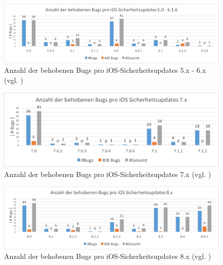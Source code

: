 \begin{figure}[htbp!]
        \centering
                \includegraphics[scale=0.5]{Bilder/iOSSicherheitsupdate5.png}
        \caption{Anzahl der behobenen Bugs pro iOS-Sicherheitsupdates 5.x - 6.x \newline (vgl. \cite{Apple[7]}) \protect\footnotemark}
        \label{fig:AnalyseiOSSicherheitsupdate5}
\end{figure}

\newpage
\begin{figure}[htbp!]
        \centering
                \includegraphics[scale=0.7]{Bilder/iOSSicherheitsupdate7.png}
        \caption{Anzahl der behobenen Bugs pro iOS-Sicherheitsupdates 7.x \newline (vgl. \cite{Apple[7]}) \protect\footnotemark}
        \label{fig:AnalyseiOSSicherheitsupdate7}
\end{figure}
\begin{figure}[htbp!]
        \centering
                \includegraphics[scale=0.54]{Bilder/iOSSicherheitsupdate8.png}
        \caption{Anzahl der behobenen Bugs pro iOS-Sicherheitsupdates 8.x \newline (vgl. \cite{Apple[7]}) \protect\footnotemark}
        \label{fig:AnalyseiOSSicherheitsupdate8}
\end{figure}

